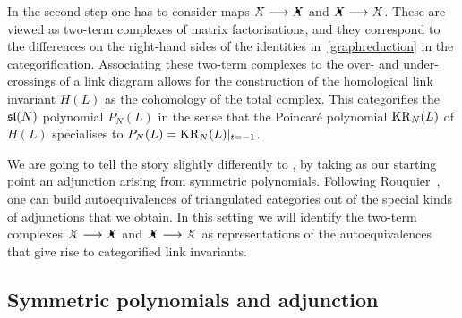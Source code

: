 \documentclass{compositio}
\theoremstyle{definition}
\numberwithin{equation}{section}
\begin{document}
In the second step one has to consider maps $\Xcirc \lto \Xbul$ and $\Xbul \lto \Xcirc$. These are viewed as two-term complexes of matrix factorisations, and they correspond to the differences on the right-hand sides of the identities in~\eqref{graphreduction} in the categorification. Associating these two-term complexes to the over- and under-crossings of a link diagram allows for the construction of the homological link invariant $H(L)$ as the cohomology of the total complex. This categorifies the $\mathfrak{sl}(N)$ polynomial $P_{N}(L)$ in the sense that the Poincar\'e polynomial $\operatorname{KR}_{N}(L)$ of $H(L)$ specialises to $P_{N}(L)=\operatorname{KR}_{N}(L)|_{t=-1}$. 

We are going to tell the story slightly differently to \cite{kr0401268}, by taking as our starting point an adjunction arising from symmetric polynomials. Following Rouquier~\cite{RouquierMexico}, one can build autoequivalences of triangulated categories out of the special kinds of adjunctions that we obtain. In this setting we will identify the two-term complexes $\Xcirc \lto \Xbul$ and $\Xbul \lto \Xcirc$ as representations of the autoequivalences that give rise to categorified link invariants. 

\subsection{Symmetric polynomials and adjunction}
\end{document}

